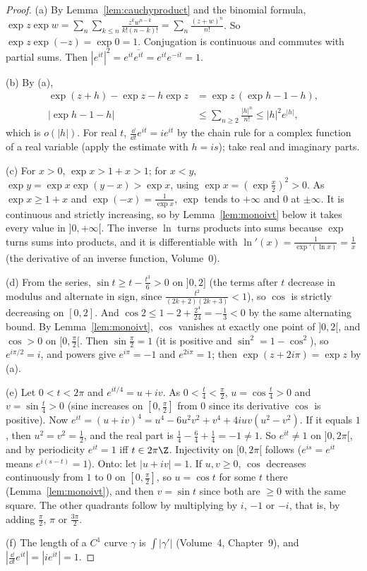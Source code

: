 \begin{proof}
(a) By Lemma~\ref{lem:cauchyproduct} and the binomial formula, $\exp z\exp w=\sum_n\sum_{k\le n}\frac{z^kw^{n-k}}{k!(n-k)!}=\sum_n\frac{(z+w)^n}{n!}$. So $\exp z\exp(-z)=\exp0=1$.
Conjugation is continuous and commutes with partial sums. Then $|e^{it}|^2=e^{it}\overline{e^{it}}=e^{it}e^{-it}=1$.

(b) By (a),
\[
\begin{aligned}\exp(z+h)-\exp z-h\exp z&=\exp z\,(\exp h-1-h),\\|\exp h-1-h|&\le\sum_{n\ge2}\frac{|h|^n}{n!}\le|h|^2e^{|h|},\end{aligned}
\]
which is $o(|h|)$. For real $t$,
$\frac{\dd}{\dd t}e^{it}=ie^{it}$ by the chain rule for a complex function of a real variable (apply the estimate with $h=is$); take real and
imaginary parts.

(c) For $x>0$, $\exp x>1+x>1$; for $x<y$, $\exp y=\exp x\exp(y-x)>\exp x$, using $\exp x=(\exp\frac x2)^2>0$. As $\exp x\ge1+x$ and $\exp(-x)=\frac1{\exp x}$, $\exp$
tends to $+\infty$ and $0$ at $\pm\infty$. It is continuous and strictly increasing, so by Lemma~\ref{lem:monoivt} below it takes every value in
$]0,+\infty[$. The inverse $\ln$ turns products into sums because $\exp$ turns sums into products, and it is differentiable with
$\ln'(x)=\frac1{\exp'(\ln x)}=\frac1x$ (the derivative of an inverse function, Volume~0).

(d) From the series, $\sin t\ge t-\frac{t^3}6>0$ on $]0,2]$ (the terms after $t$ decrease in modulus and alternate in sign, since $\frac{t^2}{(2k+2)(2k+3)}<1$),
so $\cos$ is strictly decreasing on $[0,2]$. And $\cos2\le1-2+\frac{2^4}{24}=-\frac13<0$ by the same alternating bound. By Lemma~\ref{lem:monoivt}, $\cos$
vanishes at exactly one point of $]0,2[$, and $\cos>0$ on $[0,\frac\pi2[$. Then $\sin\frac\pi2=1$ (it is positive and $\sin^2=1-\cos^2$), so $e^{i\pi/2}=i$, and
powers give $e^{i\pi}=-1$ and $e^{2i\pi}=1$; then $\exp(z+2i\pi)=\exp z$ by (a).

(e) Let $0<t<2\pi$ and $e^{it/4}=u+iv$. As $0<\frac t4<\frac\pi2$, $u=\cos\frac t4>0$ and $v=\sin\frac t4>0$ (sine increases on $[0,\frac\pi2]$ from $0$ since its derivative $\cos$ is
positive). Now $e^{it}=(u+iv)^4=u^4-6u^2v^2+v^4+4iuv(u^2-v^2)$. If it equals $1$, then $u^2=v^2=\frac12$, and the real part is
$\frac14-\frac64+\frac14=-1\ne1$. So $e^{it}\ne1$ on $]0,2\pi[$, and by periodicity $e^{it}=1$ iff $t\in2\pi\Z$. Injectivity on $[0,2\pi[$ follows ($e^{is}=e^{it}$ means
$e^{i(s-t)}=1$). Onto: let $|u+iv|=1$. If $u,v\ge0$, $\cos$ decreases continuously from $1$ to $0$ on $[0,\frac\pi2]$, so $u=\cos t$ for some $t$ there
(Lemma~\ref{lem:monoivt}), and then $v=\sin t$ since both are $\ge0$ with the same square. The other quadrants follow by multiplying by $i$,
$-1$ or $-i$, that is, by adding $\frac\pi2$, $\pi$ or $\frac{3\pi}2$.

(f) The length of a $C^1$ curve $\gamma$ is $\int|\gamma'|$ (Volume~4, Chapter~9), and $|\frac{\dd}{\dd t}e^{it}|=|ie^{it}|=1$.
\end{proof}

